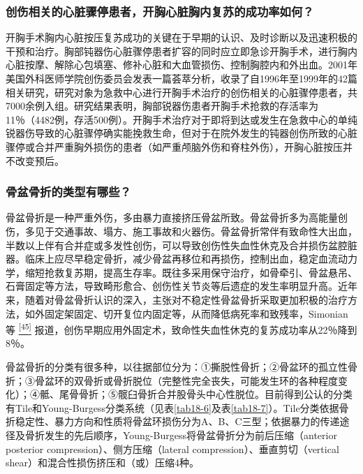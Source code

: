 \subsubsection{创伤相关的心脏骤停患者，开胸心脏胸内复苏的成功率如何？}

开胸手术胸内心脏按压复苏成功的关键在于早期的认识、及时诊断以及迅速积极的干预和治疗。胸部钝器伤心脏骤停患者扩容的同时应立即急诊开胸手术，进行胸内心脏按摩、解除心包填塞、修补心脏和大血管损伤、控制胸腔内和外出血。2001年美国外科医师学院创伤委员会发表一篇荟萃分析，收录了自1996年至1999年的42篇相关研究，研究对象为急救中心进行开胸手术治疗的创伤相关的心脏骤停患者，共7000余例入组。研究结果表明，胸部锐器伤患者开胸手术抢救的存活率为11％（4482例，存活500例）。开胸手术治疗对于即将到达或发生在急救中心的单纯锐器伤导致的心脏骤停确实能挽救生命，但对于在院外发生的钝器创伤所致的心脏骤停或合并严重胸外损伤的患者（如严重颅脑外伤和脊柱外伤），开胸心脏按压并不改变预后。

\subsubsection{骨盆骨折的类型有哪些？}

骨盆骨折是一种严重外伤，多由暴力直接挤压骨盆所致。骨盆骨折多为高能量创伤，多见于交通事故、塌方、施工事故和火器伤。骨盆骨折常伴有致命性大出血，半数以上伴有合并症或多发性创伤，可以导致创伤性失血性休克及合并损伤盆腔脏器。临床上应尽早稳定骨折，减少骨盆再移位和再损伤，控制出血，稳定血流动力学，缩短抢救复苏期，提高生存率。既往多采用保守治疗，如骨牵引、骨盆悬吊、石膏固定等方法，导致畸形愈合、创伤性关节炎等后遗症的发生率明显升高。近年来，随着对骨盆骨折认识的深入，主张对不稳定性骨盆骨折采取更加积极的治疗方法，如外固定架固定、切开复位内固定等，从而降低病死率和致残率，Simonian等
\protect\hyperlink{text00024.htmlux5cux23ch45-23}{\textsuperscript{{[}45{]}}}
报道，创伤早期应用外固定术，致命性失血性休克的复苏成功率从22％降到8％。

骨盆骨折的分类有很多种，以往据部位分为：①撕脱性骨折；②骨盆环的孤立性骨折；③骨盆环的双骨折或骨折脱位（完整性完全丧失，可能发生环的各种程度变化）；④骶、尾骨骨折；⑤髋臼骨折合并股骨头中心性脱位。目前得到公认的分类有Tile和Young-Burgess分类系统（见表\ref{tab18-6}及表\ref{tab18-7}）。Tile分类依据骨折稳定性、暴力方向和性质将骨盆环损伤分为A、B、C三型；依据暴力的传递途径及骨折发生的先后顺序，Young-Burgess将骨盆骨折分为前后压缩（anterior
posterior compression）、侧方压缩（lateral
compression）、垂直剪切（vertical
shear）和混合性损伤挤压和（或）压缩4种。

